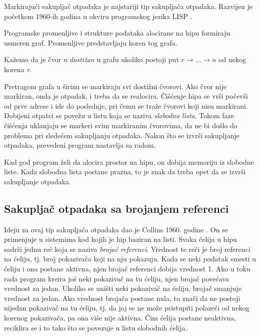 Markirajući sakupljač otpadaka je najstariji tip sakupljača otpadaka. Razvijen je početkom 1960-ih godina u okviru programskog jezika LISP \cite{mcca60}.

Programske promenljive i strukture podataka alocirane na hipu formiraju usmeren graf. Promenljive predstavljaju koren tog grafa.

\begin{definicija}
	Kažemo da je čvor \textit{n} \textit{dostižan} u grafu ukoliko postoji put $r\rightarrow \dots \rightarrow n$ od nekog korena \textit{r}.
\end{definicija}

Pretragom grafa u širinu se markiraju svi dostižni čvorovi. Ako čvor nije markiran, onda je otpadak, i treba da se realocira. Čišćenje hipa se vrši počevši od prve adrese i ide do poslednje, pri čemu se traže čvorovi koji nisu markirani. Dobijeni otpatci se povežu u listu koja se naziva \textit{slobodna lista}. Tokom faze čišćenja uklanjaju se markeri svim markiranim čvorovima, da ne bi došlo do problema pri sledećem sakupljanju otpadaka. Nakon što se izvrši sakupljanje otpadaka, prevedeni program nastavlja sa radom.

Kad god program želi da alocira prostor na hipu, on dobija memoriju iz slobodne liste. Kada slobodna lista postane prazna, to je znak da treba opet da se izvrši sakupljanje otpadaka.

\subsection{Sakupljač otpadaka sa brojanjem referenci}
\label{ref:reference counter}

Ideju za ovaj tip sakupljača otpadaka dao je Collins 1960. godine \cite{col60}. On se primenjuje u sistemima kod kojih je hip baziran na listi. Svaka ćelija u hipu sadrži jednu reč koja se naziva \textit{brojač referenci}. Vrednost te reči je broj referenci na ćeliju, tj. broj pokazivača koji na nju pokazuju. Kada se neki podatak smesti u ćeliju i ona postane aktivna, njen brojač referenci dobija vrednost 1. Ako u toku rada program kreira još neki pokazivač na tu ćeliju, njen brojač povećava vrednost za jedan. Ukoliko se uništi neki pokazivač na ćeliju, brojač smanjuje vrednost za jedan. Ako vrednost brojača postane nula, to znači da ne postoji nijedan pokazivač na tu ćeliju, tj. da joj se ne može pristupiti polazeći od nekog korenog pokazivača, pa ona više nije aktivna. Čim ćelija postane neaktivna, reciklira se i to tako što se povezuje u listu slobodnih ćelija.

